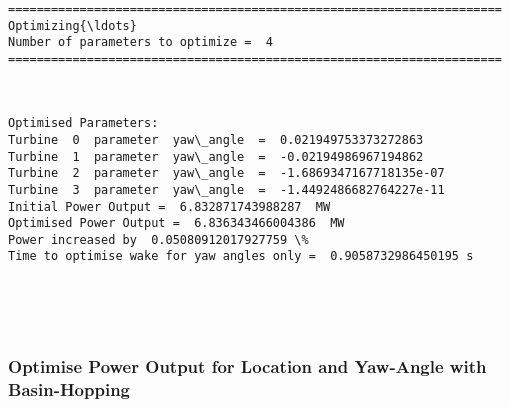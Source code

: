 \documentclass[11pt]{article}
\begin{document}
    \begin{Verbatim}[commandchars=\\\{\}]
=====================================================================
Optimizing{\ldots}
Number of parameters to optimize =  4
=====================================================================

    \end{Verbatim}

    \begin{center}
    \end{center}
    { \hspace*{\fill} \\}
    
    \begin{Verbatim}[commandchars=\\\{\}]
Optimised Parameters:
Turbine  0  parameter  yaw\_angle  =  0.021949753373272863
Turbine  1  parameter  yaw\_angle  =  -0.02194986967194862
Turbine  2  parameter  yaw\_angle  =  -1.6869347167718135e-07
Turbine  3  parameter  yaw\_angle  =  -1.4492486682764227e-11
Initial Power Output =  6.832871743988287  MW
Optimised Power Output =  6.836343466004386  MW
Power increased by  0.05080912017927759 \%
Time to optimise wake for yaw angles only =  0.9058732986450195 s

    \end{Verbatim}

    \begin{center}
    \end{center}
    { \hspace*{\fill} \\}
    
    \begin{center}
    \end{center}
    { \hspace*{\fill} \\}
    
    \hypertarget{optimise-power-output-for-location-and-yaw-angle-with-basin-hopping}{%
\subsubsection{Optimise Power Output for Location and Yaw-Angle with
Basin-Hopping}\label{optimise-power-output-for-location-and-yaw-angle-with-basin-hopping}}
\end{document}
